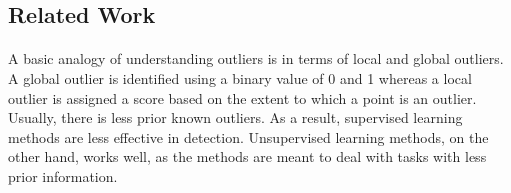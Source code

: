 \documentclass[runningheads]{llncs}
\begin{document}


\subsection{Related Work}


\paragraph{} A basic analogy of understanding outliers is in terms of local and global outliers. A global outlier is identified using a binary value of 0 and 1 whereas a local outlier is assigned a score based on the extent to which a point is an outlier. Usually, there is less prior known outliers. As a result, supervised learning methods are less effective in detection. Unsupervised learning methods, on the other hand, works well, as the methods are meant to deal with tasks with less prior information.
\end{document}
